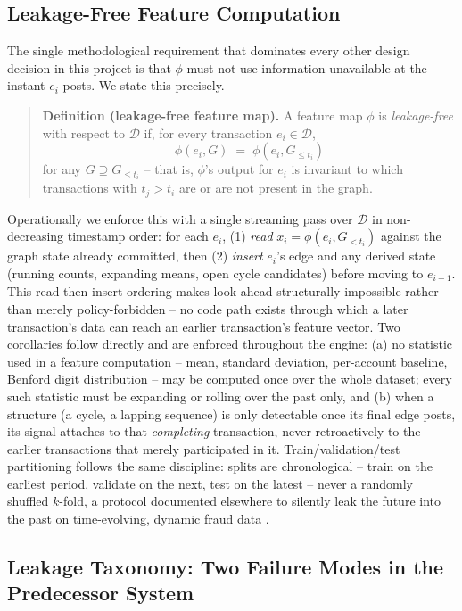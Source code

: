 \subsection{Leakage-Free Feature Computation}

The single methodological requirement that dominates every other design
decision in this project is that $\phi$ must not use information
unavailable at the instant $e_i$ posts. We state this precisely.

\begin{quote}
\textbf{Definition (leakage-free feature map).} A feature map $\phi$ is
\emph{leakage-free} with respect to $\mathcal{D}$ if, for every transaction
$e_i \in \mathcal{D}$,
\[
\phi(e_i, G) \;=\; \phi(e_i, G_{\le t_i})
\]
for any $G \supseteq G_{\le t_i}$ -- that is, $\phi$'s output for $e_i$ is
invariant to which transactions with $t_j > t_i$ are or are not present in
the graph.
\end{quote}

Operationally we enforce this with a single streaming pass over
$\mathcal{D}$ in non-decreasing timestamp order: for each $e_i$, (1)
\emph{read} $x_i = \phi(e_i, G_{<t_i})$ against the graph state already
committed, then (2) \emph{insert} $e_i$'s edge and any derived state
(running counts, expanding means, open cycle candidates) before moving to
$e_{i+1}$. This read-then-insert ordering makes look-ahead structurally
impossible rather than merely policy-forbidden -- no code path exists
through which a later transaction's data can reach an earlier
transaction's feature vector. Two corollaries follow directly and are
enforced throughout the engine: (a) no statistic used in a feature
computation -- mean, standard deviation, per-account baseline, Benford
digit distribution -- may be computed once over the whole dataset; every
such statistic must be expanding or rolling over the past only, and (b)
when a structure (a cycle, a lapping sequence) is only detectable once its
final edge posts, its signal attaches to that \emph{completing}
transaction, never retroactively to the earlier transactions that merely
participated in it. Train/validation/test partitioning follows the same
discipline: splits are chronological -- train on the earliest period,
validate on the next, test on the latest -- never a randomly shuffled
$k$-fold, a protocol documented elsewhere to silently leak the future into
the past on time-evolving, dynamic fraud data \cite{jesus2022turning}.

\subsection{Leakage Taxonomy: Two Failure Modes in the Predecessor System}

